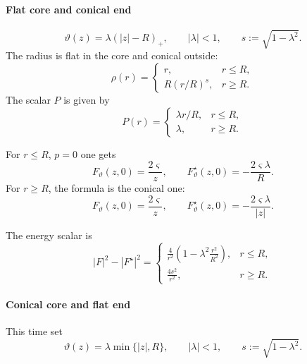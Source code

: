 \documentclass[reqno]{amsart}
\numberwithin{equation}{section}
\theoremstyle{definition}
\theoremstyle{remark}
\begin{document}
\paragraph{\textbf{Flat core and conical end}}
\begin{equation}\label{eq:flat-core-profile}
        \vartheta(z)=\lambda(|z|-R)_+,
        \qquad |\lambda|<1,
        \qquad s:=\sqrt{1-\lambda^2}.
\end{equation}
The radius is flat in the core and conical outside:
\begin{equation}\label{eq:flat-core-radius}
        \rho(r)=
        \begin{cases}
        r,& r\leq R,\\
        R(r/R)^s,& r\geq R.
        \end{cases}
\end{equation}
The scalar $P$ is given by
\begin{equation}\label{eq:flat-core-P}
        P(r)=
        \begin{cases}
        \lambda r/R,& r\leq R,\\
        \lambda,& r\geq R.
        \end{cases}
\end{equation}

For $r\leq R$, $p=0$ one gets
\begin{equation}\label{eq:flat-core-inner-F-Fstar}
        F_\vartheta(z,0)=\frac{2\varsigma}{z},
        \qquad
        F^\star_\vartheta(z,0)=-\frac{2\varsigma\lambda}{R}.
\end{equation}
For $r\geq R$, the formula is the conical one:
\begin{equation}\label{eq:flat-core-outer-F-Fstar}
        F_\vartheta(z,0)=\frac{2\varsigma}{z},
        \qquad
        F^\star_\vartheta(z,0)=-\frac{2\varsigma\lambda}{|z|}.
\end{equation}

The energy scalar is
\begin{equation}\label{eq:flat-core-energy-scalar}
        |F|^2-|F^\star|^2
        =
        \begin{cases}
        \displaystyle \frac4{r^2}\left(1-\lambda^2\frac{r^2}{R^2}\right),& r\leq R,\\[2mm]
        \displaystyle \frac{4s^2}{r^2},& r\geq R.
        \end{cases}
\end{equation}
\paragraph{\textbf{Conical core and flat end}}
This time set 
\begin{equation}\label{eq:conical-core-profile}
        \vartheta(z)=\lambda\min\{|z|,R\},
        \qquad |\lambda|<1,
        \qquad s:=\sqrt{1-\lambda^2}.
\end{equation}
\end{document}
